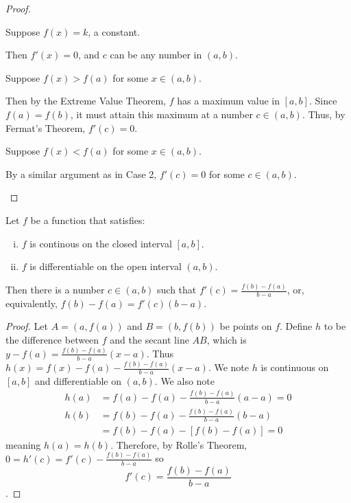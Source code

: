 \documentclass[a4paper,11pt]{article}
\begin{document}
\begin{outline}
    \begin{proof}
      \begin{proofcases}
        \item 
          Suppose \(f(x) = k\), a constant. 
          
          Then \(f'(x) = 0\), and \(c\) can be any number in \((a, b)\).
        \item
          Suppose \(f(x) > f(a)\) for some \(x \in (a, b)\). 
          
          Then by the Extreme Value Theorem, \(f\) has a
          maximum value in \([a, b]\). Since \(f(a)=f(b)\), it must attain this maximum at a number \(c \in (a, b)\).
          Thus, by Fermat's Theorem, \(f'(c) = 0\).
        \item 
          Suppose \(f(x) < f(a)\) for some \(x \in (a, b)\). 
          
          By a similar argument as in Case 2, \(f'(c) = 0\) for some \(c \in (a, b)\).
      \end{proofcases}
    \end{proof}
    
  \pagebreak
    Let \(f\) be a function that satisfies:
    \begin{enumerate}[i.]
      \item \(f\) is continous on the closed interval \([a, b]\).
      \item \(f\) is differentiable on the open interval \((a, b)\).
    \end{enumerate}
    Then there is a number \(c \in (a, b)\) such that \(f'(c) = \frac{f(b)-f(a)}{b-a}\), or, equivalently,
    \(f(b)-f(a) = f'(c)(b-a)\).
    
    \begin{proof}
      Let \(A = (a, f(a))\) and \(B = (b, f(b))\) be points on \(f\). Define \(h\) to be the difference between
      \(f\) and the secant line \(AB\), which is \(y - f(a) = \frac{f(b)-f(a)}{b-a}(x-a)\). Thus \(h(x) =
      f(x)-f(a)-\frac{f(b)-f(a)}{b-a}(x-a)\). We note \(h\) is continuous on \([a, b]\) and differentiable on
      \((a, b)\). We also note 
      \begin{align*}
        h(a) &= f(a)-f(a)-\frac{f(b)-f(a)}{b-a}(a-a) = 0\\
        h(b) &= f(b)-f(a)-\frac{f(b)-f(a)}{b-a}(b-a)\\
             &= f(b)-f(a)-[f(b)-f(a)] = 0
      \end{align*}
      meaning \(h(a)=h(b)\). Therefore, by Rolle's Theorem, \(0 = h'(c) = f'(c) - 
      \frac{f(b)-f(a)}{b-a}\) so \[f'(c) = \frac{f(b)-f(a)}{b-a}\].
    \end{proof}
    

\end{outline}
\end{document}
